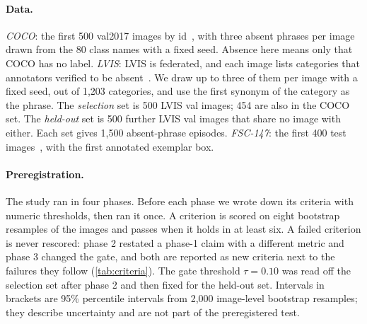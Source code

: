 \paragraph{Data.}
\emph{COCO}: the first 500 val2017 images by id~\cite{lin2014coco}, with three absent phrases per image drawn from the 80 class names with a fixed seed.
Absence here means only that COCO has no label.
\emph{LVIS}: LVIS is federated, and each image lists categories that annotators verified to be absent~\cite{gupta2019lvis}.
We draw up to three of them per image with a fixed seed, out of 1,203 categories, and use the first synonym of the category as the phrase.
The \emph{selection} set is 500 LVIS val images; 454 are also in the COCO set.
The \emph{held-out} set is 500 further LVIS val images that share no image with either.
Each set gives 1,500 absent-phrase episodes.
\emph{FSC-147}: the first 400 test images~\cite{ranjan2021fsc}, with the first annotated exemplar box.

\paragraph{Preregistration.}
The study ran in four phases.
Before each phase we wrote down its criteria with numeric thresholds, then ran it once.
A criterion is scored on eight bootstrap resamples of the images and passes when it holds in at least six.
A failed criterion is never rescored: phase 2 restated a phase-1 claim with a different metric and phase 3 changed the gate, and both are reported as new criteria next to the failures they follow (\cref{tab:criteria}).
The gate threshold $\tau = 0.10$ was read off the selection set after phase 2 and then fixed for the held-out set.
Intervals in brackets are 95\% percentile intervals from 2,000 image-level bootstrap resamples; they describe uncertainty and are not part of the preregistered test.
